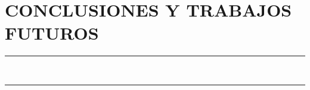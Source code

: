 \pagestyle{plain}
\chapter{CONCLUSIONES Y TRABAJOS FUTUROS}\label{cap:ConclusionesYTrabajosFuturos}
\vspace{0.2cm}
\noindent\rule{\linewidth}{1.5pt}\\
\startcontents[chapters]
\vspace{0.2cm}
\noindent\rule{\linewidth}{1.3pt}\\
\newpage



